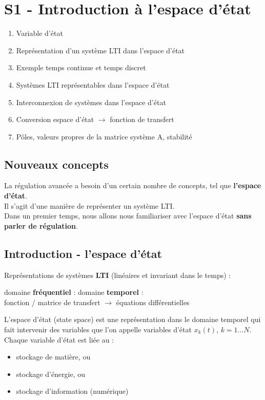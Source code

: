 \documentclass[document.tex]{subfiles}
\begin{document}
\section{S1 - Introduction à l'espace d'état}

\begin{enumerate}
\item Variable d'état
\item Représentation d'un système LTI dans l'espace d'état
\item Exemple temps continue et temps discret
\item Systèmes LTI représentables dans l'espace d'état
\item Interconnexion de systèmes dans l'espace d'état
\item Conversion espace d'état $\rightarrow$ fonction de transfert
\item Pôles, valeurs propres de la matrice système A, stabilité
\end{enumerate}

\subsection{Nouveaux concepts}
La régulation avancée a besoin d'un certain nombre de concepts, tel que \textbf{l'espace d'état}.\\

Il s'agit d'une manière de représenter un système LTI.\\

Dans un premier temps, nous allons nous familiariser avec l'espace d'état \textbf{sans parler de régulation}.

\subsection{Introduction - l'espace d'état}

Représentations de systèmes \textbf{LTI} (linéaires et invariant dans le temps) :

\begin{center}
domaine \textbf{fréquentiel} :  \hfill domaine \textbf{temporel} : \\
fonction / matrice de transfert  		\hfill $\rightarrow$ \hfill équations différentielles
\end{center}

L'espace d'état (state space) est une représentation dans le domaine temporel
qui fait intervenir des variables que l'on appelle variables d'état $ x_k(t) $, $ k = 1 \ldots N $. \\
Chaque variable d'état est liée au : 
\begin{itemize}
\item stockage de matière, ou
\item stockage d'énergie, ou
\item stockage d'information (numérique)
\end{itemize}
\end{document}

